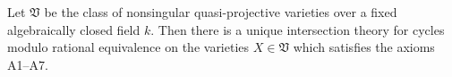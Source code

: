 Let $\mathfrak{V}$ be the class of nonsingular quasi-projective varieties over a fixed algebraically closed field $k$. Then there is a unique intersection theory for cycles modulo rational equivalence on the varieties $X \in \mathfrak{V}$ which satisfies the axioms A1--A7.
